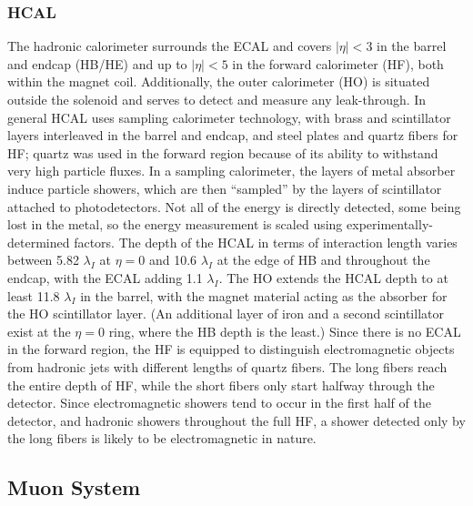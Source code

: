\subsubsection{HCAL}
The hadronic calorimeter surrounds the ECAL and 
covers $|\eta| < 3$ in the barrel and endcap (HB/HE) 
and up to $|\eta| < 5$ in the forward calorimeter (HF),
both within the magnet coil.
Additionally, the outer calorimeter (HO) is situated 
outside the solenoid and serves to detect 
and measure any leak-through.
In general HCAL uses sampling calorimeter technology, 
with brass and scintillator layers interleaved 
in the barrel and endcap, 
and steel plates and quartz fibers for HF; 
quartz was used in the forward region 
because of its ability to 
withstand very high particle fluxes.  
In a sampling calorimeter, the layers of metal absorber 
induce particle showers, which are then 
``sampled'' by the layers of scintillator 
attached to photodetectors.  
Not all of the energy is directly detected, 
some being lost in the metal,
so the energy measurement is scaled using 
experimentally-determined factors.  
The depth of the HCAL 
in terms of interaction length 
varies between 5.82 $\lambda_I$ at $\eta = 0$ and 
10.6 $\lambda_I$ at the edge of HB and throughout 
the endcap, 
with the ECAL adding 1.1 $\lambda_I$.  
The HO extends the HCAL depth to at least 
11.8 $\lambda_I$ in the barrel, 
with the magnet material acting as the absorber for 
the HO scintillator layer.  
(An additional layer of iron and 
a second scintillator exist
at the $\eta = 0$ ring, 
where the HB depth is the least.)
Since there is no ECAL in the forward region, 
the HF is equipped to distinguish electromagnetic 
objects from hadronic jets with different 
lengths of quartz fibers.  
The long fibers reach the entire depth of HF, 
while the short fibers only start halfway through 
the detector.
Since electromagnetic showers tend to occur in the 
first half of the detector, 
and hadronic showers throughout the full HF, 
a shower detected only by the long fibers 
is likely to be electromagnetic in nature.  

\subsection{Muon System}


